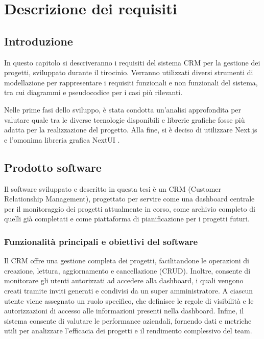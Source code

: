 \documentclass[target=bach,aauheader=,style=]{thud}
\begin{document}
\chapter{Descrizione dei requisiti}

\section{Introduzione}
In questo capitolo si descriveranno i requisiti del sistema CRM per la gestione dei progetti, sviluppato durante il tirocinio. Verranno utilizzati diversi strumenti di modellazione per rappresentare i requisiti funzionali e non funzionali del sistema, tra cui diagrammi e pseudocodice per i casi più rilevanti.

\noindent Nelle prime fasi dello sviluppo, è stata condotta un'analisi approfondita per valutare quale tra le diverse tecnologie disponibili e librerie grafiche fosse più adatta per la realizzazione del progetto. Alla fine, si è deciso di utilizzare Next.js \cite{nextjs2024} e l'omonima libreria grafica NextUI \cite{nextui2024}. 

\section{Prodotto software}
Il software sviluppato e descritto in questa tesi è un CRM (Customer Relationship Management), progettato per servire come una dashboard centrale per il monitoraggio dei progetti attualmente in corso, come archivio completo di quelli già completati e come piattaforma di pianificazione per i progetti futuri.

\subsection{Funzionalità principali e obiettivi del software}
Il CRM offre una gestione completa dei progetti, facilitandone le operazioni di creazione, lettura, aggiornamento e cancellazione (CRUD). Inoltre, consente di monitorare gli utenti autorizzati ad accedere alla dashboard, i quali vengono creati tramite inviti generati e condivisi da un super amministratore. A ciascun utente viene assegnato un ruolo specifico, che definisce le regole di visibilità e le autorizzazioni di accesso alle informazioni presenti nella dashboard. Infine, il sistema consente di valutare le performance aziendali, fornendo dati e metriche utili per analizzare l'efficacia dei progetti e il rendimento complessivo del team.
\end{document}
